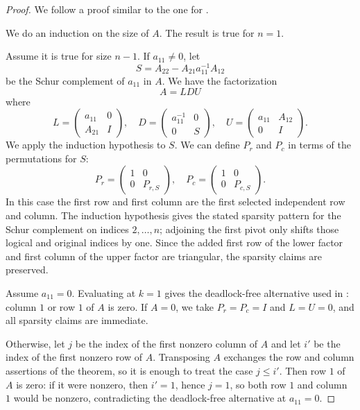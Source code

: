 \documentclass[10pt,twoside]{siamart1116}
\numberwithin{theorem}{section}
\begin{document}
\begin{proof}
  We follow a proof similar to the one for .

  We do an induction on the size of $A$. The result is true for $n=1$.

  Assume it is true for size $n-1$. If $a_{11} \neq 0$, let
  \[
    S = A_{22} - A_{21} a_{11}^{-1} A_{12}
  \]
  be the Schur complement of $a_{11}$ in $A$. We have the factorization
  \[
    A = LDU
  \]
  where
  \[
    L =
    \begin{pmatrix}
      a_{11} & 0 \\
      A_{21} & I
    \end{pmatrix}, \quad
    D =
    \begin{pmatrix}
      a_{11}^{-1} & 0 \\
      0           & S
    \end{pmatrix}, \quad
    U =
    \begin{pmatrix}
      a_{11} & A_{12} \\
      0      & I
    \end{pmatrix}.
  \]
  We apply the induction hypothesis to $S$. We can define $P_r$ and $P_c$ in terms of the permutations for $S$:
  \[ P_r =
    \begin{pmatrix}
      1 & 0       \\
      0 & P_{r,S}
    \end{pmatrix}, \quad
    P_c =
    \begin{pmatrix}
      1 & 0       \\
      0 & P_{c,S}
    \end{pmatrix}.
  \]
  In this case the first row and first column are the first selected independent row and column. The induction hypothesis gives the stated sparsity pattern for the Schur complement on indices $2,\ldots,n$; adjoining the first pivot only shifts those logical and original indices by one. Since the added first row of the lower factor and first column of the upper factor are triangular, the sparsity claims are preserved.

  Assume $a_{11} = 0$. Evaluating  at $k = 1$ gives the deadlock-free alternative used in : column $1$ or row $1$ of $A$ is zero. If $A = 0$, we take $P_r = P_c = I$ and $L = U = 0$, and all sparsity claims are immediate.

  Otherwise, let $j$ be the index of the first nonzero column of $A$ and let $i'$ be the index of the first nonzero row of $A$. Transposing $A$ exchanges the row and column assertions of the theorem, so it is enough to treat the case $j \le i'$. Then row $1$ of $A$ is zero: if it were nonzero, then $i'=1$, hence $j=1$, so both row $1$ and column $1$ would be nonzero, contradicting the deadlock-free alternative at $a_{11}=0$.


\end{proof}
\end{document}
